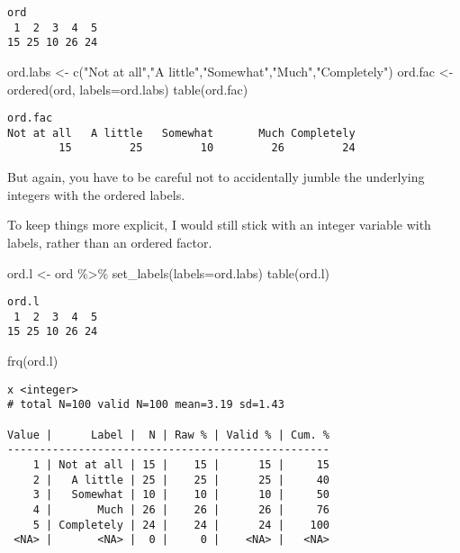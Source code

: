 \documentclass[
  letterpaper,
  DIV=11,
  numbers=noendperiod]{scrreprt}
\newenvironment{Shaded}{\begin{snugshade}}{\end{snugshade}}
\newcommand{\AttributeTok}[1]{\textcolor[rgb]{0.40,0.45,0.13}{#1}}
\newcommand{\FunctionTok}[1]{\textcolor[rgb]{0.28,0.35,0.67}{#1}}
\newcommand{\NormalTok}[1]{\textcolor[rgb]{0.00,0.23,0.31}{#1}}
\newcommand{\OtherTok}[1]{\textcolor[rgb]{0.00,0.23,0.31}{#1}}
\newcommand{\SpecialCharTok}[1]{\textcolor[rgb]{0.37,0.37,0.37}{#1}}
\newcommand{\StringTok}[1]{\textcolor[rgb]{0.13,0.47,0.30}{#1}}
\begin{document}
\begin{verbatim}
ord
 1  2  3  4  5 
15 25 10 26 24 
\end{verbatim}

\begin{Shaded}
\begin{Highlighting}[]
\NormalTok{ord.labs }\OtherTok{\textless{}{-}} \FunctionTok{c}\NormalTok{(}\StringTok{"Not at all"}\NormalTok{,}\StringTok{"A little"}\NormalTok{,}\StringTok{"Somewhat"}\NormalTok{,}\StringTok{"Much"}\NormalTok{,}\StringTok{"Completely"}\NormalTok{)}
\NormalTok{ord.fac }\OtherTok{\textless{}{-}} \FunctionTok{ordered}\NormalTok{(ord, }\AttributeTok{labels=}\NormalTok{ord.labs)}
\FunctionTok{table}\NormalTok{(ord.fac)}
\end{Highlighting}
\end{Shaded}

\begin{verbatim}
ord.fac
Not at all   A little   Somewhat       Much Completely 
        15         25         10         26         24 
\end{verbatim}

But again, you have to be careful not to accidentally jumble the
underlying integers with the ordered labels.

To keep things more explicit, I would still stick with an integer
variable with labels, rather than an ordered factor.

\begin{Shaded}
\begin{Highlighting}[]
\NormalTok{ord.l }\OtherTok{\textless{}{-}}\NormalTok{ ord }\SpecialCharTok{\%\textgreater{}\%}
  \FunctionTok{set\_labels}\NormalTok{(}\AttributeTok{labels=}\NormalTok{ord.labs)}
\FunctionTok{table}\NormalTok{(ord.l)}
\end{Highlighting}
\end{Shaded}

\begin{verbatim}
ord.l
 1  2  3  4  5 
15 25 10 26 24 
\end{verbatim}

\begin{Shaded}
\begin{Highlighting}[]
\FunctionTok{frq}\NormalTok{(ord.l)}
\end{Highlighting}
\end{Shaded}

\begin{verbatim}
x <integer> 
# total N=100 valid N=100 mean=3.19 sd=1.43

Value |      Label |  N | Raw % | Valid % | Cum. %
--------------------------------------------------
    1 | Not at all | 15 |    15 |      15 |     15
    2 |   A little | 25 |    25 |      25 |     40
    3 |   Somewhat | 10 |    10 |      10 |     50
    4 |       Much | 26 |    26 |      26 |     76
    5 | Completely | 24 |    24 |      24 |    100
 <NA> |       <NA> |  0 |     0 |    <NA> |   <NA>
\end{verbatim}
\end{document}
